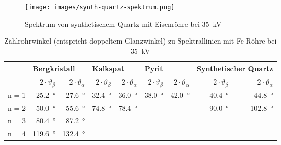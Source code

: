\begin{figure}[h!]
    \centering
    \texttt{[image: images/synth-quartz-spektrum.png]}
    \caption{Spektrum von synthetischem Quartz  mit Eisenr\"ohre bei \SI{35}{\kilo\volt}}
    \label{fig:spektrum:synth_quartz}
\end{figure}

\clearpage
\begin{table}[h!]
    \centering
    \small
    \caption{%
        Z\"ahlrohrwinkel (entspricht doppeltem  Glanzwinkel) zu Spektrallinien
        mit Fe-R\"ohre bei \SI{35}{\kilo\volt}
    }
    \label{tab:spektra:otherCrystals}
    \begin{tabular}{lrrrrrrrr}
        \toprule
        &
        \multicolumn{2}{l}{Bergkristall}         &
        \multicolumn{2}{l}{Kalkspat}             &
        \multicolumn{2}{l}{Pyrit}                &
        \multicolumn{2}{l}{Synthetischer Quartz} \\
        \midrule

        &
        $2 \cdot \vartheta_\beta$  &
        $2 \cdot \vartheta_\alpha$ &
        $2 \cdot \vartheta_\beta$  &
        $2 \cdot \vartheta_\alpha$ &
        $2 \cdot \vartheta_\beta$  &
        $2 \cdot \vartheta_\alpha$ &
        $2 \cdot \vartheta_\beta$  &
        $2 \cdot \vartheta_\alpha$ \\

        \midrule

        n = 1              &
        \SI{25.2}{\degree} &
        \SI{27.6}{\degree} &
        \SI{32.4}{\degree} &
        \SI{36.0}{\degree} &
        \SI{38.0}{\degree} &
        \SI{42.0}{\degree} &
        \SI{40.4}{\degree} &
        \SI{44.8}{\degree} \\

        n = 2               &
        \SI{ 50.0}{\degree} &
        \SI{ 55.6}{\degree} &
        \SI{ 74.8}{\degree} &
        \SI{ 78.4}{\degree} &
                            &
                            &
        \SI{ 90.0}{\degree} &
        \SI{102.8}{\degree} \\

        n = 3               &
        \SI{ 80.4}{\degree} &
        \SI{ 87.2}{\degree} &
                            &
                            &
                            &
                            &
                            &
                            \\

        n = 4               &
        \SI{119.6}{\degree} &
        \SI{132.4}{\degree} &
                            &
                            &
                            &
                            &
                            &
                            \\

        \bottomrule
    \end{tabular}
\end{table}

